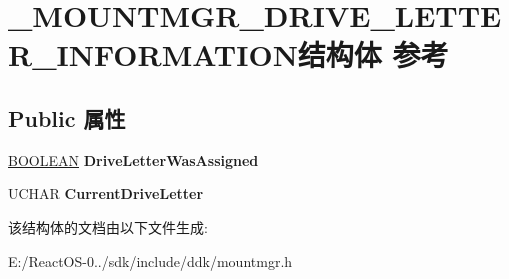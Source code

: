 \hypertarget{struct___m_o_u_n_t_m_g_r___d_r_i_v_e___l_e_t_t_e_r___i_n_f_o_r_m_a_t_i_o_n}{}\section{\+\_\+\+M\+O\+U\+N\+T\+M\+G\+R\+\_\+\+D\+R\+I\+V\+E\+\_\+\+L\+E\+T\+T\+E\+R\+\_\+\+I\+N\+F\+O\+R\+M\+A\+T\+I\+O\+N结构体 参考}
\label{struct___m_o_u_n_t_m_g_r___d_r_i_v_e___l_e_t_t_e_r___i_n_f_o_r_m_a_t_i_o_n}
\subsection*{Public 属性}
\begin{DoxyCompactItemize}
\item 
\mbox{\label{struct___m_o_u_n_t_m_g_r___d_r_i_v_e___l_e_t_t_e_r___i_n_f_o_r_m_a_t_i_o_n_a5e174fa0623f166a92a1be3ad0c3904b}} 
\hyperlink{_processor_bind_8h_a112e3146cb38b6ee95e64d85842e380a}{B\+O\+O\+L\+E\+AN} {\bfseries Drive\+Letter\+Was\+Assigned}
\item 
\mbox{\label{struct___m_o_u_n_t_m_g_r___d_r_i_v_e___l_e_t_t_e_r___i_n_f_o_r_m_a_t_i_o_n_af005fc3d5ac05b0315ebaf1c63d41f4a}} 
U\+C\+H\+AR {\bfseries Current\+Drive\+Letter}
\end{DoxyCompactItemize}


该结构体的文档由以下文件生成\+:\begin{DoxyCompactItemize}
\item 
E\+:/\+React\+O\+S-\/0../sdk/include/ddk/mountmgr.\+h\end{DoxyCompactItemize}
